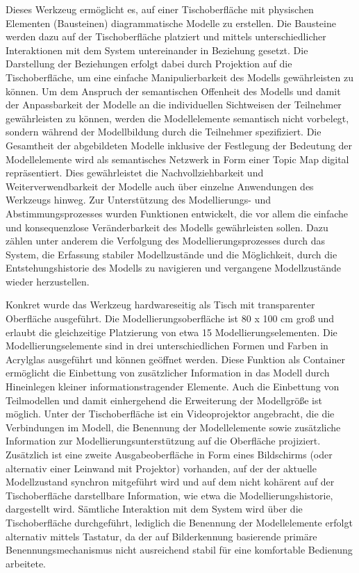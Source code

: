 Dieses Werkzeug ermöglicht es, auf einer Tischoberfläche mit physischen Elementen (Bausteinen) diagrammatische Modelle zu erstellen. Die Bausteine werden dazu auf der Tischoberfläche platziert und mittels unterschiedlicher Interaktionen mit dem System untereinander in Beziehung gesetzt. Die Darstellung der Beziehungen erfolgt dabei durch Projektion auf die Tischoberfläche, um eine einfache Manipulierbarkeit des Modells gewährleisten zu können. Um dem Anspruch der semantischen Offenheit des Modells und damit der Anpassbarkeit der Modelle an die individuellen Sichtweisen der Teilnehmer gewährleisten zu können, werden die Modellelemente semantisch nicht vorbelegt, sondern während der Modellbildung durch die Teilnehmer spezifiziert. Die Gesamtheit der abgebildeten Modelle inklusive der Festlegung der Bedeutung der Modellelemente wird als semantisches Netzwerk in Form einer Topic Map digital repräsentiert. Dies gewährleistet die Nachvollziehbarkeit und Weiterverwendbarkeit der Modelle auch über einzelne Anwendungen des Werkzeugs hinweg. Zur Unterstützung des Modellierungs- und Abstimmungsprozesses wurden Funktionen entwickelt, die vor allem die einfache und konsequenzlose Veränderbarkeit des Modells gewährleisten sollen. Dazu zählen unter anderem die Verfolgung des Modellierungsprozesses durch das System, die Erfassung stabiler Modellzustände und die Möglichkeit, durch die Entstehungshistorie des Modells zu navigieren und vergangene Modellzustände wieder herzustellen.  

Konkret wurde das Werkzeug hardwareseitig als Tisch mit transparenter Oberfläche ausgeführt. Die Modellierungsoberfläche ist 80 x 100 cm groß und erlaubt die gleichzeitige Platzierung von etwa 15 Modellierungselementen. Die Modellierungselemente sind in drei unterschiedlichen Formen und Farben in Acrylglas ausgeführt und können geöffnet werden. Diese Funktion als Container ermöglicht die Einbettung von zusätzlicher Information in das Modell durch Hineinlegen kleiner informationstragender Elemente. Auch die Einbettung von Teilmodellen und damit einhergehend die Erweiterung der Modellgröße ist möglich. Unter der Tischoberfläche ist ein Videoprojektor angebracht, die die Verbindungen im Modell, die Benennung der Modellelemente sowie zusätzliche Information zur Modellierungsunterstützung auf die Oberfläche projiziert. Zusätzlich ist eine zweite Ausgabeoberfläche in Form eines Bildschirms (oder alternativ einer Leinwand mit Projektor) vorhanden, auf der der aktuelle Modellzustand synchron mitgeführt wird und auf dem nicht kohärent auf der Tischoberfläche darstellbare Information, wie etwa die Modellierungshistorie, dargestellt wird. Sämtliche Interaktion mit dem System wird über die Tischoberfläche durchgeführt, lediglich die Benennung der Modellelemente erfolgt alternativ mittels Tastatur, da der auf Bilderkennung basierende primäre Benennungsmechanismus nicht ausreichend stabil für eine komfortable Bedienung arbeitete.

